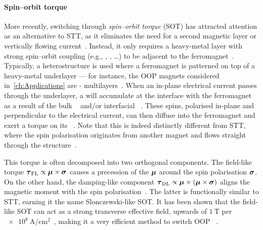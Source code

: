 \paragraph{Spin--orbit torque}
More recently, switching through \emph{spin--orbit torque} (SOT) has attracted attention as an alternative to STT, as it eliminates the need for a second magnetic layer or vertically flowing current~\cite{mumax3tutorial}.
Instead, it only requires a heavy-metal layer with strong spin--orbit coupling (e.g., , ,  \dots) to be adjacent to the ferromagnet~\cite{SOT_Roadmap}.
Typically, a heterostructure is used where a ferromagnet is patterned on top of a heavy-metal underlayer --- for instance, the OOP magnets considered in~\cref{ch:Applications} are - multilayers~\cite{KUR-24}. %
When an in-plane electrical current passes through the underlayer, a  will accumulate at the interface with the ferromagnet as a result of the bulk ~\cite{SHE} and/or interfacial ~\cite{SOT_Rashba}. %
These spins, polarised in-plane and perpendicular to the electrical current, can then diffuse into the ferromagnet and exert a torque on its ~\cite{mumax3tutorial}.
Note that this is indeed distinctly different from STT, where the spin polarisation originates from another magnet and flows straight through the structure~\cite{SOT_Roadmap}. \par
This torque is often decomposed into two orthogonal components.
The field-like torque $\boldsymbol{\mathbf{\tau}}_\mathrm{FL} \propto \boldsymbol{\mathbf{\mu}} \times \boldsymbol{\mathbf{\sigma}}$ causes a precession of the  $\boldsymbol{\mathbf{\mu}}$ around the spin polarisation $\boldsymbol{\mathbf{\sigma}}$.
On the other hand, the damping-like component $\boldsymbol{\mathbf{\tau}}_\mathrm{DL} \propto \boldsymbol{\mathbf{\mu}} \times (\boldsymbol{\mathbf{\mu}} \times \boldsymbol{\mathbf{\sigma}})$ aligns the magnetic moment with the spin polarisation~\cite{SOT_Roadmap,SOT_FM_AFM}.
The latter is functionally similar to STT, earning it the name Slonczewski-like SOT.
It has been shown that the field-like SOT can act as a strong transverse effective field, upwards of $\SI{1}{\tesla}$ per $\SI{e8}{\ampere\per\centi\metre\squared}$~\cite{SOT_Rashba}, making it a very efficient method to switch OOP ~\cite{vlasov2022optimal,SOTswitchingCoPt,SHE_CurrentInducedSwitching,SpintronicsEnergyEfficientComputing}. \par
